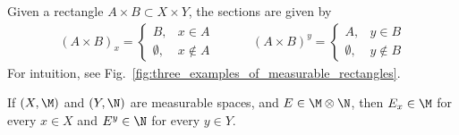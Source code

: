 \documentclass{article} %
\begin{document}
\begin{example}{}
Given a rectangle $A \times B \subset X \times Y$, the sections are given by  
\begin{align}
(A \times B)_x = 
\begin{cases}
B,& x \in A \\
\emptyset, & x \not\in A	
\end{cases} \quad \quad \quad 
(A \times B)^y = 
\begin{cases}
A,& y \in B \\
\emptyset, & y \not\in B 	
\end{cases}
\label{eqn:sections_of_rectangles}
\end{align}
{\tiny For intuition, see Fig.~\ref{fig:three_examples_of_measurable_rectangles}.}
\label{ex:sections_of_rectangles}
\end{example}


\begin{proposition}{} If $(X,\M)$ and $(Y,\N)$ are measurable spaces, and $E \in \M \otimes \N$, then $E_x \in \M$ for every $x \in X$ and $E^y \in \N$ for every $y \in Y$. 
\label{prop:sections_of_a_measurable_set_are_measurable}
\end{proposition}
\end{document}
